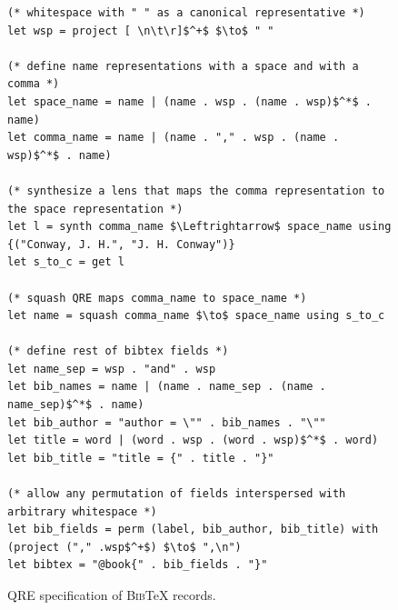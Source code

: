 \documentclass[acmsmall,review,anonymous]{acmart}\settopmatter{printfolios=true,printccs=false,printacmref=false}
\newcommand{\bibtex}{\textsc{Bib}\TeX{}}
\newcommand{\cd}[1]{\lstinline[backgroundcolor=\color{white}]$#1$}
\begin{document}
\begin{figure}[t]
\begin{lstlisting}
(* whitespace with " " as a canonical representative *)
let wsp = project [ \n\t\r]$^+$ $\to$ " "

(* define name representations with a space and with a comma *)
let space_name = name | (name . wsp . (name . wsp)$^*$ . name)
let comma_name = name | (name . "," . wsp . (name . wsp)$^*$ . name)

(* synthesize a lens that maps the comma representation to the space representation *)
let l = synth comma_name $\Leftrightarrow$ space_name using {("Conway, J. H.", "J. H. Conway")}
let s_to_c = get l

(* squash QRE maps comma_name to space_name *)
let name = squash comma_name $\to$ space_name using s_to_c

(* define rest of bibtex fields *)
let name_sep = wsp . "and" . wsp
let bib_names = name | (name . name_sep . (name . name_sep)$^*$ . name)
let bib_author = "author = \"" . bib_names . "\""
let title = word | (word . wsp . (word . wsp)$^*$ . word)
let bib_title = "title = {" . title . "}"

(* allow any permutation of fields interspersed with arbitrary whitespace *)
let bib_fields = perm (label, bib_author, bib_title) with (project ("," .wsp$^+$) $\to$ ",\n")
let bibtex = "@book{" . bib_fields . "}"
\end{lstlisting}
\caption{QRE specification of \bibtex{} records. }
\label{fig:example-qre}
\end{figure}




\end{document}
